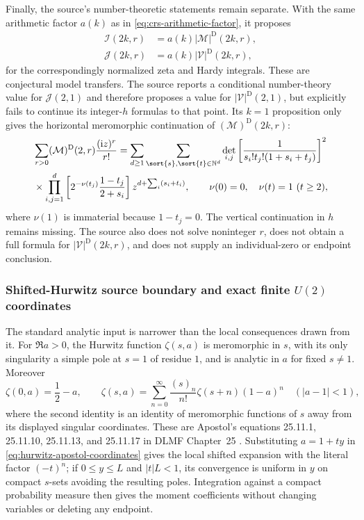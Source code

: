 Finally, the source's number-theoretic statements remain separate.  With the same
arithmetic factor $a(k)$ as in \eqref{eq:crs-arithmetic-factor}, it proposes
\begin{align}
 \mathcal I(2k,r)&=a(k)|\mathcal M|^{\mathrm D}(2k,r),
 \label{eq:dehaye-zeta-moment-proposal}\\
 \mathcal J(2k,r)&=a(k)|\mathcal V|^{\mathrm D}(2k,r),
 \label{eq:dehaye-hardy-moment-proposal}
\end{align}
for the correspondingly normalized zeta and Hardy integrals.  These are conjectural
model transfers.  The source reports a conditional number-theory value for
$\mathcal J(2,1)$ and therefore proposes a value for
$|\mathcal V|^{\mathrm D}(2,1)$, but explicitly fails to continue its integer-$h$
formulas to that point.  Its $k=1$ proposition only gives the horizontal
meromorphic continuation of $(\mathcal M)^{\mathrm D}(2k,r)$:
\begin{multline}
 \sum_{r>0}(\mathcal M)^{\mathrm D}(2,r)\frac{(\mathrm iz)^r}{r!}
 =\sum_{d\geq1}\sum_{\sort{s},\sort{t}\in\mathbb N^d}
 \det_{i,j}\left[\frac1{s_i!t_j!(1+s_i+t_j)}\right]^2\\
 {}\times\prod_{i,j=1}^{d}
 \left[2^{-\nu(t_j)}\frac{1-t_j}{2+s_i}\right]
 z^{d+\sum_i(s_i+t_i)},
 \qquad
 \nu(0)=0,\quad \nu(t)=1\ (t\geq2),
 \label{eq:dehaye-k-one-series}
\end{multline}
where $\nu(1)$ is immaterial because $1-t_j=0$.  The vertical continuation in $h$
remains missing.  The source also does not solve noninteger $r$, does not obtain a
full formula for $|\mathcal V|^{\mathrm D}(2k,r)$, and does not supply an
individual-zero or endpoint conclusion.

\subsubsection{Shifted-Hurwitz source boundary and exact finite
\texorpdfstring{$U(2)$}{U(2)} coordinates}

The standard analytic input is narrower than the local consequences drawn from it.  For
$\Re a>0$, the Hurwitz function $\zeta(s,a)$ is meromorphic in $s$, with its only singularity
a simple pole at $s=1$ of residue $1$, and is analytic in $a$ for fixed $s\ne1$.  Moreover
\begin{equation}
 \zeta(0,a)=\frac12-a,
 \qquad
 \zeta(s,a)=\sum_{n=0}^{\infty}
 \frac{(s)_n}{n!}\zeta(s+n)(1-a)^n
 \quad (|a-1|<1),
 \label{eq:hurwitz-apostol-coordinates}
\end{equation}
where the second identity is an identity of meromorphic functions of $s$ away from its
displayed singular coordinates.  These are Apostol's equations 25.11.1, 25.11.10,
25.11.13, and 25.11.17 in DLMF Chapter~25
\cite[\S25.11]{apostolDLMF25}.  Substituting $a=1+ty$ in
\eqref{eq:hurwitz-apostol-coordinates} gives the local shifted expansion with the literal
factor $(-t)^n$; if $0\le y\le L$ and $|t|L<1$, its convergence is uniform in $y$ on compact
$s$-sets avoiding the resulting poles.  Integration against a compact probability measure
then gives the moment coefficients without changing variables or deleting any endpoint.

